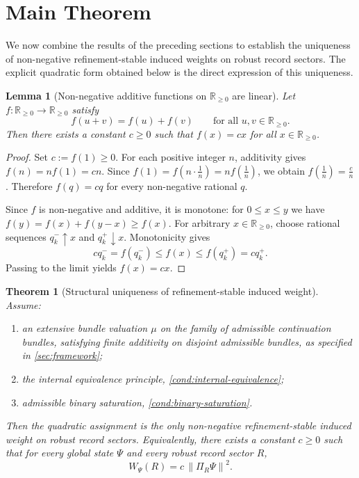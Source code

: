 \documentclass[11pt]{article}
\newtheorem{lemma}{Lemma}
\newtheorem{theorem}{Theorem}
\theoremstyle{remark}
\numberwithin{equation}{section}
\newcommand{\RR}{\mathbb{R}}
\newcommand{\Wpsi}[1]{W_{\Psi}\!\left(#1\right)}
\newcommand{\Proj}[1]{\Pi_{#1}}
\newcommand{\norm}[1]{\left\lVert #1 \right\rVert}
\begin{document}
\section{Main Theorem}
\label{sec:main-theorem}

We now combine the results of the preceding sections to establish the
uniqueness of non-negative refinement-stable induced weights on robust
record sectors. The explicit quadratic form obtained below is the
direct expression of this uniqueness.

\begin{lemma}[Non-negative additive functions on $\RR_{\geq 0}$ are linear]
\label{lem:cauchy}
Let $f : \RR_{\geq 0} \to \RR_{\geq 0}$ satisfy
\[
  f(u + v) = f(u) + f(v)
  \qquad \text{for all } u, v \in \RR_{\geq 0}.
\]
Then there exists a constant $c \geq 0$ such that $f(x) = cx$ for all
$x \in \RR_{\geq 0}$.
\end{lemma}

\begin{proof}
Set $c := f(1) \geq 0$. For each positive integer $n$, additivity gives
$f(n) = nf(1) = cn$. Since $f(1) = f(n \cdot \tfrac{1}{n}) = n
f(\tfrac{1}{n})$, we obtain $f(\tfrac{1}{n}) = \tfrac{c}{n}$. Therefore
$f(q) = cq$ for every non-negative rational $q$.

Since $f$ is non-negative and additive, it is monotone: for $0 \leq x
\leq y$ we have $f(y) = f(x) + f(y - x) \geq f(x)$. For arbitrary $x
\in \RR_{\geq 0}$, choose rational sequences $q_k^- \uparrow x$ and
$q_k^+ \downarrow x$. Monotonicity gives
\[
  c q_k^- = f(q_k^-) \leq f(x) \leq f(q_k^+) = c q_k^+.
\]
Passing to the limit yields $f(x) = cx$.
\end{proof}

\begin{theorem}[Structural uniqueness of refinement-stable induced weight]
\label{thm:quadratic-uniqueness}
Assume:
\begin{enumerate}[label=(\roman*)]
\item an extensive bundle valuation $\mu$ on the family of admissible
  continuation bundles, satisfying finite additivity on disjoint
  admissible bundles, as specified in \cref{sec:framework};
\item the internal equivalence principle, \cref{cond:internal-equivalence};
\item admissible binary saturation, \cref{cond:binary-saturation}.
\end{enumerate}
Then the quadratic assignment is the only non-negative
refinement-stable induced weight on robust record sectors.
Equivalently, there exists a constant $c \geq 0$ such that for every
global state $\Psi$ and every robust record sector $R$,
\[
  \Wpsi{R} = c\,\norm{\Proj{R}\Psi}^2.
\]
\end{theorem}
\end{document}

